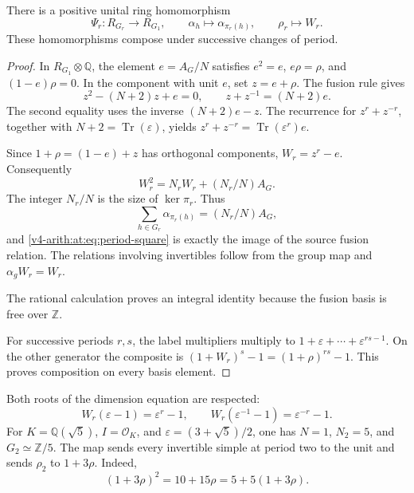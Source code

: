 \begin{theorem}\label{v4-arith:at:thm:period-ring}
There is a positive unital ring homomorphism
\[
 \Psi_r:R_{G_r}\longrightarrow R_{G_1},\qquad
 \alpha_h\longmapsto\alpha_{\pi_r(h)},\qquad
 \rho_r\longmapsto W_r.
\]
These homomorphisms compose under successive changes of period.
\end{theorem}
\begin{proof}
In \(R_{G_1}\otimes\mathbb Q\), the element \(e=A_G/N\)
satisfies \(e^2=e\), \(e\rho=\rho\), and \((1-e)\rho=0\).
In the component with unit \(e\), set \(z=e+\rho\).
The fusion rule gives
\[
 z^2-(N+2)z+e=0,\qquad z+z^{-1}=(N+2)e.
\]
The second equality uses the inverse \((N+2)e-z\).
The recurrence for \(z^r+z^{-r}\), together with
\(N+2=\operatorname{Tr}(\varepsilon)\), yields
\(z^r+z^{-r}=\operatorname{Tr}(\varepsilon^r)e\).

Since \(1+\rho=(1-e)+z\) has orthogonal components,
\(W_r=z^r-e\). Consequently
\begin{equation}\label{v4-arith:at:eq:period-square}
 W_r^2=N_rW_r+(N_r/N)A_G.
\end{equation}
The integer \(N_r/N\) is the size of \(\ker\pi_r\). Thus
\[
 \sum_{h\in G_r}\alpha_{\pi_r(h)}=(N_r/N)A_G,
\]
and \eqref{v4-arith:at:eq:period-square} is exactly the image of the
source fusion relation. The relations involving invertibles follow
from the group map and \(\alpha_gW_r=W_r\).

The rational calculation proves an integral identity because the
fusion basis is free over \(\mathbb Z\).

For successive periods \(r,s\), the label multipliers multiply
to \(1+\varepsilon+\cdots+\varepsilon^{rs-1}\). On the other
generator the composite is
\((1+W_r)^s-1=(1+\rho)^{rs}-1\).
This proves composition on every basis element.
\end{proof}

Both roots of the dimension equation are respected:
\[
 W_r(\varepsilon-1)=\varepsilon^r-1,\qquad
 W_r(\varepsilon^{-1}-1)=\varepsilon^{-r}-1.
\]
For \(K=\mathbb Q(\sqrt5)\), \(I=\mathcal O_K\), and
\(\varepsilon=(3+\sqrt5)/2\), one has \(N=1\),
\(N_2=5\), and \(G_2\simeq\mathbb Z/5\).
The map sends every invertible simple at period two to the unit
and sends \(\rho_2\) to \(1+3\rho\). Indeed,
\[
 (1+3\rho)^2=10+15\rho=5+5(1+3\rho).
\]




